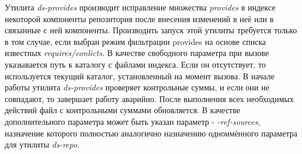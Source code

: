 Утилита \textit{ds-provides} производит исправление множества \textit{provides} в индексе
некоторой компоненты репозитория после внесения изменений в неё или
в связанные с ней компоненты. Производить запуск этой утилиты требуется
только в том случае, если выбран режим фильтрации provides на основе
списка известных \textit{requires/conlicts}. В качестве свободного параметра при 
вызове указывается путь к каталогу с файлами индекса. Если он отсутствует,
то используется текущий каталог, установленный на момент вызова. В начале
работы утилита \textit{ds-provides} проверяет контрольные суммы, и если они
не совпадают, то завершает работу аварийно. После выполнения всех 
необходимых действий файл с контрольными суммами обновляется. В качестве
дополнительного параметра может быть указан параметр - \textit{-ref-sources},
назначение которого полностью аналогично назначению одноимённого параметра
для утилиты \textit{ds-repo}.



\newpage








